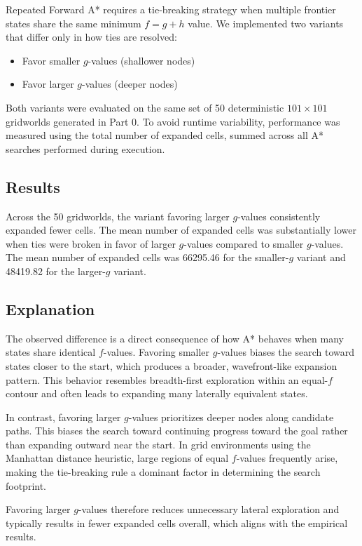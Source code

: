 \documentclass{article}
\begin{document}
Repeated Forward A* requires a tie-breaking strategy when multiple frontier states share the same minimum $f = g + h$ value. We implemented two variants that differ only in how ties are resolved:

\begin{itemize}
    \item Favor smaller $g$-values (shallower nodes)
    \item Favor larger $g$-values (deeper nodes)
\end{itemize}

Both variants were evaluated on the same set of 50 deterministic $101 \times 101$ gridworlds generated in Part 0. To avoid runtime variability, performance was measured using the total number of expanded cells, summed across all A* searches performed during execution.

\subsection{Results}

Across the 50 gridworlds, the variant favoring larger $g$-values consistently expanded fewer cells. The mean number of expanded cells was substantially lower when ties were broken in favor of larger $g$-values compared to smaller $g$-values. The mean number of expanded cells was 66295.46 for the smaller-$g$ variant and 48419.82 for the larger-$g$ variant.

\subsection{Explanation}

The observed difference is a direct consequence of how A* behaves when many states share identical $f$-values. Favoring smaller $g$-values biases the search toward states closer to the start, which produces a broader, wavefront-like expansion pattern. This behavior resembles breadth-first exploration within an equal-$f$ contour and often leads to expanding many laterally equivalent states.

In contrast, favoring larger $g$-values prioritizes deeper nodes along candidate paths. This biases the search toward continuing progress toward the goal rather than expanding outward near the start. In grid environments using the Manhattan distance heuristic, large regions of equal $f$-values frequently arise, making the tie-breaking rule a dominant factor in determining the search footprint.

Favoring larger $g$-values therefore reduces unnecessary lateral exploration and typically results in fewer expanded cells overall, which aligns with the empirical results.
\end{document}
